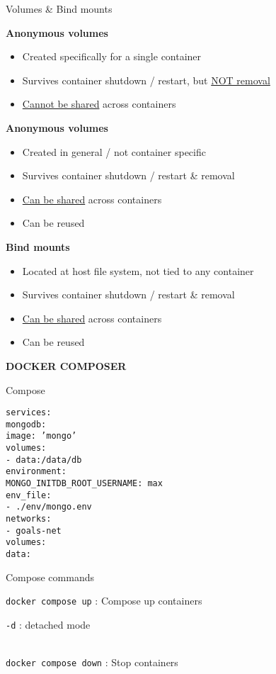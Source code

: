 \documentclass[10pt]{article}
\newcommand{\code}[1]{{\color{teal}\texttt{#1}}}
\newcommand{\cmd}[3][.3]{\code{#2} : #3 \\[#1em]}
\newcommand{\opts}[2][.5]{\hspace*{.5cm}\begin{minipage}{0.9\textwidth}
  #2
  \vspace*{-1em}
\end{minipage}\\[#1em]}
\newcommand{\opt}[2]{
  \code{#1} : #2 \\
}
\newcommand{\cluster}[2]{\begin{mybox}{#1}
  #2
  \vspace*{-1.3em}
\end{mybox}}
\newcommand{\summary}[2]{\begin{summarybox}{#1}
  #2
  \vspace*{-1.3em}
\end{summarybox}}
\newcommand{\headline}[1]{\textbf{\color{teal}#1}}
\newcommand{\feature}[2]{
  \headline{#1}
  \vspace*{-.5em}
  \begin{itemize}
    \setlength\itemsep{-.1em}
    \small
    #2
  \end{itemize}
  \vspace*{.3em}
}
\newcommand{\mytitle}[1]{
  \begin{center}
    \begin{titlebox}
      {\large \textbf{#1}}
    \end{titlebox}
  \end{center}
  \vspace*{-1.8em}
}
\begin{document}
\begin{multicols*}{2}
  \summary{Volumes \& Bind mounts}{
    \feature{Anonymous volumes}{
      \item Created specifically for a single container
      \item Survives container shutdown / restart, but \underline{NOT removal}
      \item \underline{Cannot be shared} across containers
    }
    \feature{Anonymous volumes}{
      \item Created in general / not container specific
      \item Survives container shutdown / restart \& removal
      \item \underline{Can be shared} across containers
      \item Can be reused
    }
    \feature{Bind mounts}{
      \item Located at host file system, not tied to any container
      \item Survives container shutdown / restart \& removal
      \item \underline{Can be shared} across containers
      \item Can be reused
    }
  }
\end{multicols*}

\newpage

\mytitle{DOCKER COMPOSER}

\begin{multicols*}{2}

  \cluster{Compose}{
  \code{services:\\
  \hspace*{1em}mongodb: \\
  \hspace*{2em}image: 'mongo' \\
  \hspace*{2em}volumes: \\
  \hspace*{3em}- data:{\slash}data{\slash}db \\
  \hspace*{2em}environment: \\
  \hspace*{3em}MONGO\_INITDB\_ROOT\_USERNAME: max \\
  \hspace*{2em}env\_file: \\
  \hspace*{3em}- .{\slash}env{\slash}mongo.env \\
  \hspace*{2em}networks: \\
  \hspace*{3em}- goals-net \\
  volumes: \\
  \hspace*{1em}data: \\
  }
  }

  \cluster{Compose commands}{
    \cmd{docker compose up}{Compose up containers}
    \opts{
      \opt{-d}{detached mode}
    }
    \cmd{docker compose down}{Stop containers}
  }

\end{multicols*}
\end{document}
